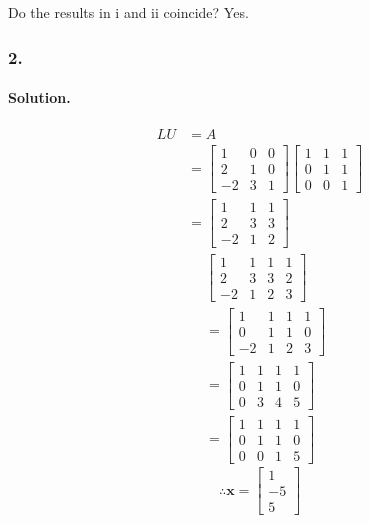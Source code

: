 Do the results in i and ii coincide? Yes.
\newpage
\subsubsection{2.}
\paragraph*{Solution.}
\begin{align*}
    LU&=A\\
    &=\begin{bmatrix}
        1&0&0\\
        2&1&0\\
        -2&3&1
    \end{bmatrix}\begin{bmatrix}
        1&1&1\\0&1&1\\0&0&1
    \end{bmatrix}\\
    &=\begin{bmatrix}
        1&1&1\\2&3&3\\-2&1&2
    \end{bmatrix}
\end{align*}
\begin{align*}
    &\left[\begin{array}{ccc|c}
        1&1&1&1\\
        2&3&3&2\\
        -2&1&2&3
    \end{array}\right]
    \\&=\left[\begin{array}{ccc|c}
        1&1&1&1\\
        0&1&1&0\\
        -2&1&2&3
    \end{array}\right]
    \\&=\left[\begin{array}{ccc|c}
        1&1&1&1\\
        0&1&1&0\\
        0&3&4&5
    \end{array}\right]
    \\&=\left[\begin{array}{ccc|c}
        1&1&1&1\\
        0&1&1&0\\
        0&0&1&5
    \end{array}\right]
\end{align*}
$$\therefore\mathbf{x}=\begin{bmatrix}
    1\\-5\\5
\end{bmatrix}$$
\newpage

